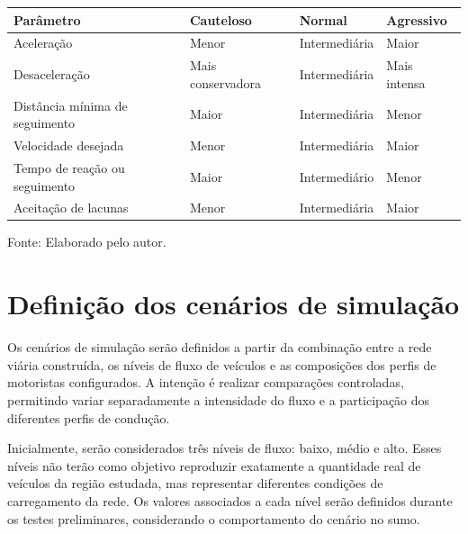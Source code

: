 \begin{quadro}[htbp]
\centering
\caption{Tendências esperadas dos parâmetros por perfil de motorista}
\label{qua:perfis-motoristas}
\small
\renewcommand{\arraystretch}{1.25}

\begin{tabular}{|p{5.4cm} | p{3.0cm} | p{2.8cm} | p{2.8cm}|}
\hline
\textbf{Parâmetro} & \textbf{Cauteloso} & \textbf{Normal} & \textbf{Agressivo} \\
\hline
Aceleração & Menor & Intermediária & Maior \\
\hline
Desaceleração & Mais conservadora & Intermediária & Mais intensa \\
\hline
Distância mínima de seguimento & Maior & Intermediária & Menor \\
\hline
Velocidade desejada & Menor & Intermediária & Maior \\
\hline
Tempo de reação ou seguimento & Maior & Intermediário & Menor \\
\hline
Aceitação de lacunas & Menor & Intermediária & Maior \\
\hline
\end{tabular}

\par\vspace{0.25cm}
\begin{minipage}{\textwidth}
\footnotesize Fonte: Elaborado pelo autor.
\end{minipage}

\end{quadro}

\section{Definição dos cenários de simulação}

Os cenários de simulação serão definidos a partir da combinação entre a rede viária construída, os níveis de fluxo de veículos e as composições dos perfis de motoristas configurados. A intenção é realizar comparações controladas, permitindo variar separadamente a intensidade do fluxo e a participação dos diferentes perfis de condução.

Inicialmente, serão considerados três níveis de fluxo: baixo, médio e alto. Esses níveis não terão como objetivo reproduzir exatamente a quantidade real de veículos da região estudada, mas representar diferentes condições de carregamento da rede. Os valores associados a cada nível serão definidos durante os testes preliminares, considerando o comportamento do cenário no \gls{sumo}.

